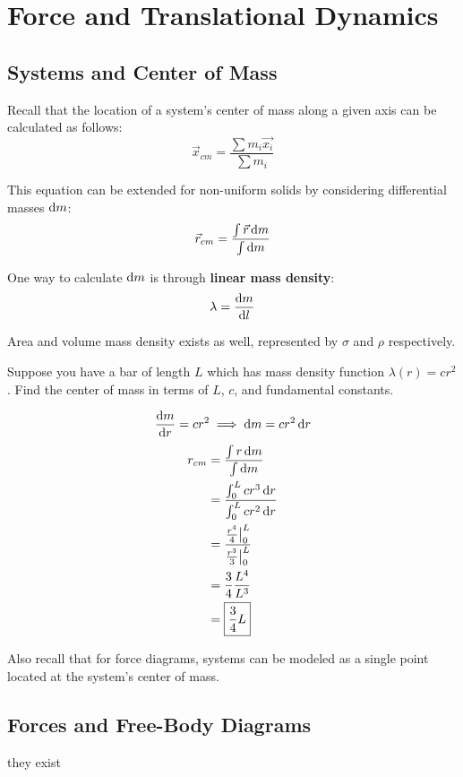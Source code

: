 \documentclass{article}
\begin{document}
\newpage

\section{ Force and Translational Dynamics}

\subsection{Systems and Center of Mass}
Recall that the location of a system's center of mass along a given axis can be calculated as follows:
\[\vec{x}_{cm} = \frac{\sum m_i \vec{x_i}}{\sum m_i}\]

This equation can be extended for non-uniform solids by considering differential masses $\odif{m}$:
\[\vec{r}_{cm} = \frac{\int \vec{r} \odif{m}}{\int \odif{m}}\]

One way to calculate $\odif{m}$ is through \textbf{linear mass density}:
\[\lambda = \odv{m}{l}\]

Area and volume mass density exists as well, represented by $\sigma$ and $\rho$ respectively.

\begin{example}
    Suppose you have a bar of length $L$ which has mass density function $\lambda(r) = cr^2$.
    Find the center of mass in terms of $L$, $c$, and fundamental constants.
\end{example}
\begin{answer}
    \[\odv{m}{r} = cr^2 \implies \odif{m} = cr^2\odif{r}\]
    \begin{align*}
        r_{cm} &= \frac{\int r \odif{m}}{\int \odif{m}} \\
        &= \frac{\int_{0}^{L} cr^3 \odif{r}}{\int_{0}^{L} cr^2 \odif{r}} \\
        &= \frac{\frac{r^4}{4} \big|_{0}^{L}}{\frac{r^3}{3} \big|_{0}^{L}} \\
        &= \frac{3}{4} \frac{L^4}{L^3} \\
        &= \boxed{\frac{3}{4} L}
    \end{align*}
\end{answer}

Also recall that for force diagrams, systems can be modeled as a single point located at the system's center of mass.

\subsection{Forces and Free-Body Diagrams}
they exist
\end{document}
